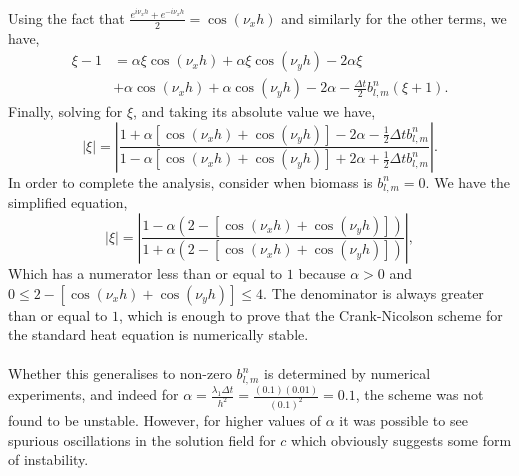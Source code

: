 Using the fact that $ \frac{e^{i \nu_x h}+  e^{-i \nu_x h}}{2} = \cos(\nu_x h)$ and similarly for
the other terms, we have,
\begin{equation*}
    \begin{split}
        \xi - 1 &=
         \alpha \xi \cos(\nu_x h) 
       + \alpha \xi \cos(\nu_y h) 
       -2 \alpha \xi   \\
       &+\alpha \cos(\nu_x h) 
       + \alpha \cos(\nu_y h) 
       -2 \alpha
       -\frac{\Delta t}{2} b_{l,m}^{n} (\xi + 1).
    \end{split}
\end{equation*}
Finally, solving for $\xi$, and taking its absolute value we have,
\begin{equation*}
    |\xi| = \left| \frac{1 + \alpha \left[ \cos(\nu_x h) + \cos(\nu_y h) \right] - 2 \alpha -\frac{1}{2} \Delta t b_{l,m}^{n} }
                        {1 -\alpha \left[ \cos(\nu_x h) + \cos(\nu_y h) \right]  + 2 \alpha +\frac{1}{2} \Delta t b_{l,m}^{n}} \right|.
\end{equation*}
In order to complete the analysis, consider when biomass is $b_{l,m}^{n} = 0$. We have the simplified
equation,
\begin{equation*}
    |\xi| = \left| \frac{1 -\alpha(2 - \left[ \cos(\nu_x h) + \cos(\nu_y h) \right]) }
                        {1 +\alpha(2 - \left[ \cos(\nu_x h) + \cos(\nu_y h)\right])} \right|,
\end{equation*}
Which has a numerator less than or equal to $1$ because $\alpha > 0$ and 
$0 \leq 2 - \left[ \cos(\nu_x h) + \cos(\nu_y h) \right] \leq 4$. The denominator is 
always greater than or equal to $1$, which is enough to prove that
the Crank-Nicolson scheme for the standard heat equation is numerically stable.
\\
\\
Whether this generalises to non-zero $b_{l,m}^{n}$ is determined by numerical experiments, and 
indeed for $\alpha = \frac{\lambda_1 \Delta t}{h^2} = \frac{(0.1) (0.01)}{(0.1)^2} = 0.1$, the scheme 
was not found to be unstable. However, for higher values of $\alpha$ it was possible to see spurious 
oscillations in the solution field for $c$ which obviously suggests some form of instability.





